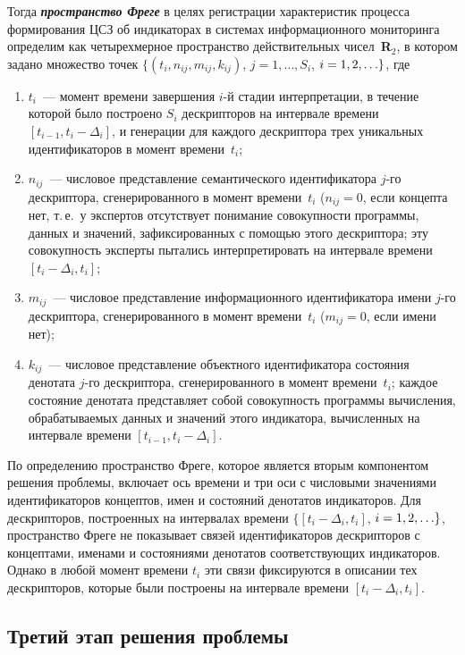 \begin{multicols}{2}
Тогда {\bfseries\textit{пространство Фреге}} в целях регистрации характеристик 
процесса формирования ЦСЗ об индикаторах в системах информационного мониторинга 
определим как четырехмерное пространство действительных чисел~\textbf{R}$_2$, в 
котором задано множество точек $\{(t_i, n_{ij}, m_{ij}, k_{ij})$, 
$j = 1, \ldots , S_i$, $i \hm= 1, 2,  \ldots\}$, где
\begin{enumerate}[(1)]
\item $t_i$~--- момент времени завершения $i$-й стадии интерпретации, в течение 
которой было построено $S_i$ дескрипторов на интервале времени $[t_{i-1}, t_i -
\Delta_i]$, и генерации для каждого дескриптора трех уникальных идентификаторов в 
момент времени~$t_i$;
\item $n_{ij}$~--- числовое представление семантического идентификатора $j$-го 
дескриптора, сгенерированного в момент времени~$t_i$ ($n_{ij}=0$, если кон\-цеп\-та 
нет, т.\,е.\ у экспертов отсутствует понимание совокупности программы, данных и 
значений, зафиксированных с помощью этого дескриптора; эту совокупность 
эксперты пытались интерпретировать на интервале времени $[t_i - \Delta_i, t_i]$;
\item $m_{ij}$~--- числовое представление информационного идентификатора имени 
$j$-го дескриптора, сгенерированного в момент времени~$t_i$ ($m_{ij}= 0$, если 
имени нет);
\item $k_{ij}$~--- числовое представление объектного идентификатора состояния 
денотата $j$-го дескриптора, сгенерированного в момент времени~$t_i$; каж\-дое 
состояние денотата представляет собой совокупность программы вычисления, 
обрабатываемых данных и значений этого индикатора, вычисленных на интервале 
времени $[t_{i-1}, t_i -\Delta_i]$.
\end{enumerate}


   По определению пространство Фреге, которое является вторым компонентом решения 
проблемы, включает ось времени и три оси с числовыми значениями идентификаторов 
концептов, имен и состояний денотатов индикаторов. Для дескрипторов, построенных на 
интервалах времени $\{[t_i - \Delta_i, t_i]$, $i\hm= 1, 2, \ldots\}$, пространство Фреге не 
показывает связей идентификаторов дескрипторов с концептами, именами и состояниями 
денотатов соответствующих индикаторов. Однако в любой момент времени $t_i$ эти связи 
фиксируются в описании тех дескрипторов, которые были построены на интервале времени 
$[t_i - \Delta_i, t_i]$.
   
   \subsection{Третий этап решения проблемы} %
   

\end{multicols}
